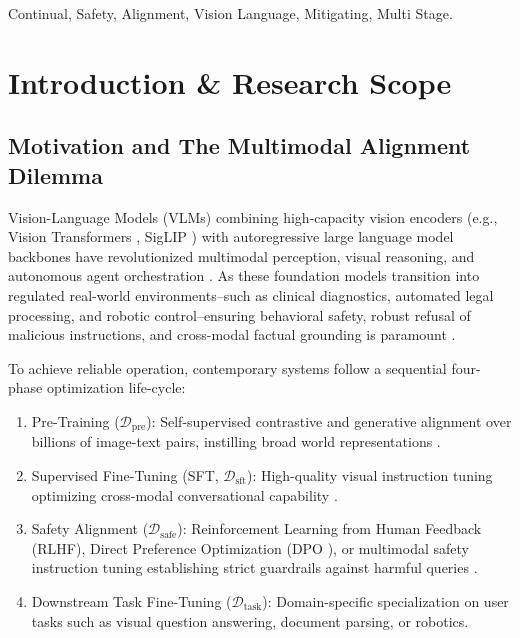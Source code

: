 \documentclass[10pt,journal,compsoc,twocolumn]{IEEEtran}
\begin{document}
\begin{IEEEkeywords}
Continual, Safety, Alignment, Vision Language, Mitigating, Multi Stage.
\end{IEEEkeywords}






\section{Introduction \& Research Scope}



\subsection{Motivation and The Multimodal Alignment Dilemma}

Vision-Language Models (VLMs) combining high-capacity vision encoders (e.g., Vision Transformers \cite{crossref_10_1109_tip_2023_3256763}, SigLIP \cite{crossref_10_48550_arxiv_2502_14786}) with autoregressive large language model backbones \cite{arxiv_2005_14165} have revolutionized multimodal perception, visual reasoning, and autonomous agent orchestration \cite{arxiv_2203_02155}. As these foundation models transition into regulated real-world environments--such as clinical diagnostics, automated legal processing, and robotic control--ensuring behavioral safety, robust refusal of malicious instructions, and cross-modal factual grounding is paramount \cite{arxiv_2312_03893}.

To achieve reliable operation, contemporary systems follow a sequential four-phase optimization life-cycle:
\begin{enumerate}
  \item Pre-Training ($\mathcal{D}_{\text{pre}}$): Self-supervised contrastive and generative alignment over billions of image-text pairs, instilling broad world representations \cite{arxiv_2010_11146}.
  \item Supervised Fine-Tuning (SFT, $\mathcal{D}_{\text{sft}}$): High-quality visual instruction tuning optimizing cross-modal conversational capability \cite{arxiv_2305_18290}.
  \item Safety Alignment ($\mathcal{D}_{\text{safe}}$): Reinforcement Learning from Human Feedback (RLHF), Direct Preference Optimization (DPO \cite{arxiv_2305_18290}), or multimodal safety instruction tuning establishing strict guardrails against harmful queries \cite{arxiv_2406_00584}.
  \item Downstream Task Fine-Tuning ($\mathcal{D}_{\text{task}}$): Domain-specific specialization on user tasks such as visual question answering, document parsing, or robotics.
\end{enumerate}
\end{document}
